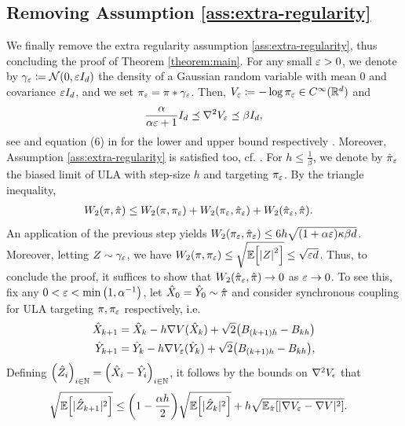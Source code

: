 \documentclass[11pt,a4paper]{article}
\begin{document}
    \subsection{Removing Assumption \ref{ass:extra-regularity}}
    \label{sec:removing-regularity}
    We finally remove the extra regularity assumption \ref{ass:extra-regularity}, thus concluding the proof of Theorem \ref{theorem:main}.
    For any small $\eps>0$, we denote by $\gamma_\eps \coloneqq \mathcal{N}(0, \eps I_d)$ the density of a Gaussian random variable with mean $0$ and covariance $\eps I_d$, and we set $\pi_\eps = \pi*\gamma_\eps$. Then, $V_\eps \coloneq - \log \pi_\eps \in C^\infty(\R^d)$ and 
    \[
        \frac{\alpha}{\alpha \eps + 1} I_d \preceq \hess V_\eps \preceq \beta I_d,
    \]
    see \cite{sau-wel-2014} and equation (6) in \cite{mik-she-2023} for the lower and upper bound respectively \cite{kla-put-2023-spec}.
    Moreover, Assumption \ref{ass:extra-regularity} is satisfied too, cf. \cite[Lemma 2.2]{kla-put-2023-spec}.
    For $h\le \frac1\beta$, we denote by $\hat{\pi}_{\eps}$ the biased limit of ULA with step-size $h$ and targeting $\pi_\eps$.
    By the triangle inequality, 
    \begin{align*}
        W_2(\pi,\hat \pi) & \le W_2(\pi,\pi_\eps) + W_2(\pi_\eps, \hat{\pi}_{\eps}) + W_2(\hat{\pi}_{\eps}, \hat \pi).
    \end{align*}
    An application of the previous step yields $W_2(\pi_\eps,\hat\pi_\eps) \le 6 h\sqrt{\tond*{1 + \alpha \eps}\kappa \beta d}$. Moreover, letting $Z\sim \gamma_\eps$, we have $W_2(\pi,\pi_\eps) \le \sqrt{\expe{\abs*{Z}^2}} \le \sqrt{\eps d}$.
    Thus, to conclude the proof, it suffices to show that $W_2(\hat \pi_\eps, \hat \pi) \to 0$ as $\eps \to 0$.
    To see this, fix any $0<\eps<\min{\tond*{1,\alpha^{-1}}}$, let $\hatx_0 =\hat Y_0 \sim \hat \pi$ and consider synchronous coupling for ULA targeting $\pi,  \pi_\eps$ respectively, i.e. 
    \begin{align*}
        \hat X_{k+1} &= \hat X_k - h \nabla V(\hat X_k) + \sqrt{2}\tond*{B_{(k+1)h} - B_{kh}}\\
        \hat Y_{k+1} &= \hat Y_k - h \nabla V_{\eps}(\hat Y_k) + \sqrt{2}\tond*{B_{(k+1)h} - B_{kh}},
    \end{align*}
    Defining $\tond*{\hat Z_{i}}_{i \in \mathbb{N}} = \tond*{\hat X_{i} - \hat Y_{i}}_{i\in \mathbb{N}}$, it follows by the bounds on $\hess V_{\epsilon}$ that
    \begin{align*}
        \sqrt{\expe{\abs{\hat Z_{k+1}}^{2}}} &\leq \tond*{1-\frac{\alpha h}{2}}  \sqrt{\expe{\abs{\hat Z_{k}}^{2}}} +  h\sqrt{\expewr{\hat \pi}{\abs{\nabla V_{\eps}  - \nabla V}^{2}}}.
    \end{align*}
\end{document}

